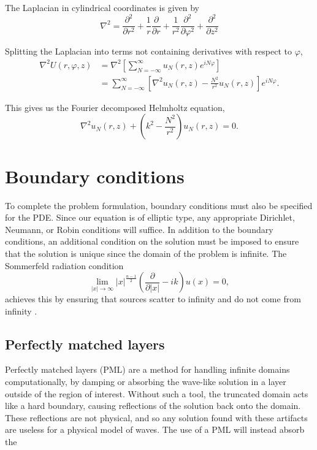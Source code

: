 The Laplacian in cylindrical coordinates is given by
\[
	\nabla^2 = \frac{\partial^2 }{\partial r^2}
			 + \frac{1}{r} \frac{\partial }{\partial r}
			 + \frac{1}{r^2} \frac{\partial^2 }{\partial \varphi^2}
			 + \frac{\partial^2 }{\partial z^2}
\]

Splitting the Laplacian into terms not containing derivatives with respect to $\varphi$,
\begin{align}
	\nabla^2 U(r,\varphi,z) 
		&= \nabla^2 \left[\sum_{N=-\infty}^\infty u_N(r,z) e^{i N \varphi}\right] \\
		&= \sum_{N=-\infty}^\infty \left[ 
										\nabla^2 u_N(r,z) - \frac{N^2}{r^2}u_N(r,z)
								   \right] e^{i N \varphi}.
\end{align}

This gives us the Fourier decomposed Helmholtz equation,
\begin{equation}
	\nabla^2 u_N(r,z) + (k^2 - \frac{N^2}{r^2})u_N(r,z) = 0. \label{eqn:fhh}
\end{equation}






\section{Boundary conditions}

To complete the problem formulation, boundary conditions must also be specified for the PDE.
Since our equation is of elliptic type, any appropriate Dirichlet, Neumann, or Robin conditions will suffice.
In addition to the boundary conditions, an additional condition on the solution must be imposed to ensure that the solution is unique since the domain of the problem is infinite.
The Sommerfeld radiation condition
\[
\lim_{|x|\rightarrow \infty} |x|^{\frac{n-1}{2}} \left( \frac{\partial}{\partial |x|} - ik \right) u(x) = 0,
\]
achieves this by ensuring that sources scatter to infinity and do not come from infinity \cite{sommerfeld}.




\subsection{Perfectly matched layers}

Perfectly matched layers (PML) are a method for handling infinite domains computationally, by damping or absorbing the wave-like solution in a layer outside of the region of interest.
Without such a tool, the truncated domain acts like a hard boundary, causing reflections of the solution back onto the domain.
These reflections are not physical, and so any solution found with these artifacts are useless for a physical model of waves.
The use of a PML will instead absorb the 


